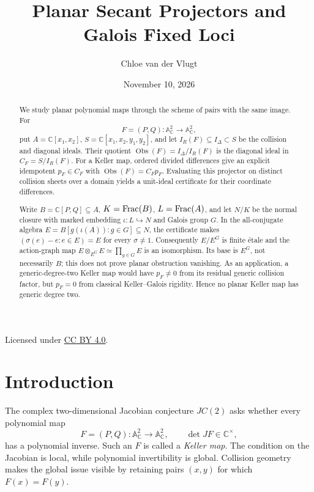\documentclass[11pt]{article}
\title{\texorpdfstring
  {Planar Secant Projectors and\\ Galois Fixed Loci}
  {Planar Secant Projectors and Galois Fixed Loci}}
\author{Chloe van der Vlugt}\date{November 10, 2026}
\newcommand{\A}{\mathbb A}
\newcommand{\C}{\mathbb C}
\newcommand{\Obs}{\operatorname{Obs}}
\begin{document}
\maketitle

\begin{abstract}
We study planar polynomial maps through the scheme of pairs with the same
image.  For
\[
  F=(P,Q)\colon\A^2_{\C}\longrightarrow\A^2_{\C},
\]
put \(A=\C[x_1,x_2]\), \(S=\C[x_1,x_2,y_1,y_2]\), and let
\(I_R(F)\subseteq I_\Delta\subset S\) be the collision and diagonal ideals.
Their quotient \(\Obs(F)=I_\Delta/I_R(F)\) is the diagonal ideal in
\(C_F=S/I_R(F)\).  For a Keller map, ordered divided differences give an
explicit idempotent \(p_F\in C_F\) with \(\Obs(F)=C_Fp_F\).  Evaluating
this projector on distinct collision sheets over a domain yields a
unit-ideal certificate for their coordinate differences.

Write \(B=\C[P,Q]\subseteq A\), \(K=\operatorname{Frac}(B)\), \(L=\operatorname{Frac}(A)\), and let
\(N/K\) be the normal closure with marked embedding
\(\iota\colon L\hookrightarrow N\) and Galois group \(G\).  In the
all-conjugate algebra \(E=B[g(\iota(A)):g\in G]\subseteq N\), the
certificate makes \((\sigma(e)-e:e\in E)=E\) for every \(\sigma\ne1\).
Consequently \(E/E^G\) is finite \'etale and the action-graph map
\(E\otimes_{E^G}E\simeq\prod_{g\in G}E\) is an isomorphism.  Its base is
\(E^G\), not necessarily \(B\); this does not prove planar obstruction
vanishing.  As an application, a generic-degree-two Keller map would have
\(p_F\ne0\) from its residual generic collision factor, but \(p_F=0\)
from classical Keller--Galois rigidity.  Hence no planar Keller map has
generic degree two.
\end{abstract}

\begin{center}
  \small Licensed under
  \href{https://creativecommons.org/licenses/by/4.0/}
    {CC BY 4.0}.
\end{center}

\clearpage
\tableofcontents

\section{Introduction}
\label{sec:introduction}

The complex two-dimensional Jacobian conjecture \(JC(2)\) asks whether every
polynomial map
\[
  F=(P,Q)\colon\A^2_{\C}\longrightarrow\A^2_{\C},
  \qquad \det JF\in\C^\times,
\]
has a polynomial inverse.  Such an \(F\) is called a \emph{Keller map}.
The condition on the Jacobian is local, while polynomial invertibility is
global.  Collision geometry makes the global issue visible by retaining
pairs \((x,y)\) for which \(F(x)=F(y)\).
\end{document}
